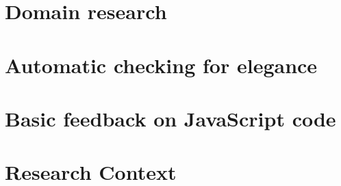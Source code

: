 
\chapter{Domain research}



\chapter{Automatic checking for elegance}


\chapter{Basic feedback on JavaScript code}



\chapter{Research Context}


